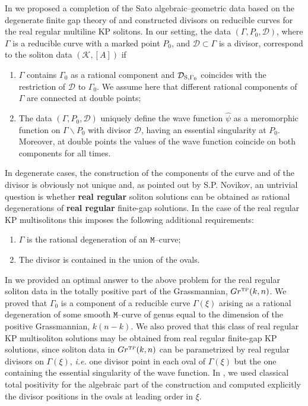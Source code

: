 \documentclass[11pt]{amsart}
\theoremstyle{plain}
\numberwithin{equation}{section}
\def \GTP {{Gr^{\mbox{\tiny TP}} (k,n)}}
\def \DS {{\mathcal D}_{\textup{\scriptsize S},\Gamma_0}}
\begin{document}
In \cite{AG1, AG3} we proposed a completion of the Sato algebraic--geometric data based on the degenerate finite gap theory of \cite{Kr3} and constructed divisors on reducible curves for the real regular multiline KP solitons. In our setting, the data $(\Gamma,P_0,\mathcal D)$, where $\Gamma$ is a reducible curve with a marked point $P_0$, and $\mathcal D\subset\Gamma$ is a divisor, correspond to the soliton data $(\mathcal K, [A])$ if
\begin{enumerate}
\item $\Gamma$ contains $\Gamma_0$ as a rational component and $\DS$ coincides with the restriction of $\mathcal D$ to $\Gamma_0$. We assume here that different rational components of $\Gamma$ are connected at double points;  
\item The data $(\Gamma,P_0,\mathcal D)$ uniquely define the wave function $\hat\psi$ as a meromorphic function on $\Gamma\backslash P_0$ with divisor $\mathcal D$, having an essential singularity at $P_0$. Moreover, at double points the values of the wave function coincide on both components for all times.
\end{enumerate}
In degenerate cases, the construction of the components of the curve and of the divisor is obviously not unique and,
as pointed out by S.P. Novikov, an untrivial question is whether \textbf{real regular} soliton solutions can be obtained as rational degenerations of \textbf{real regular} finite-gap solutions. In the case of the real regular KP multisolitons this imposes the following additional requirements:
\begin{enumerate}
\item $\Gamma$ is the rational degeneration of an $\mathtt M$--curve;
\item The divisor is contained in the union of the ovals.
\end{enumerate}

In \cite{AG1} we provided an optimal answer to the above problem for the real regular soliton data in the totally positive part of the Grassmannian, $\GTP$. We proved that $\Gamma_0$ is a component of a reducible curve $\Gamma(\xi)$ arising as a rational degeneration of some smooth $\mathtt M$--curve of genus equal to the dimension of the positive Grassmannian, $k(n-k)$. We also proved that this class of real regular KP multisoliton solutions may be obtained from real regular finite-gap KP solutions, since soliton data in $\GTP$ can be parametrized by real regular divisors on $\Gamma(\xi)$, {\sl i.e.} one divisor point in each oval of $\Gamma(\xi)$ but the one containing the essential singularity of the wave function.  In \cite{AG1}, we used classical total positivity for the algebraic part of the construction and computed explicitly the divisor positions in the ovals at leading order in $\xi$.
\end{document}
